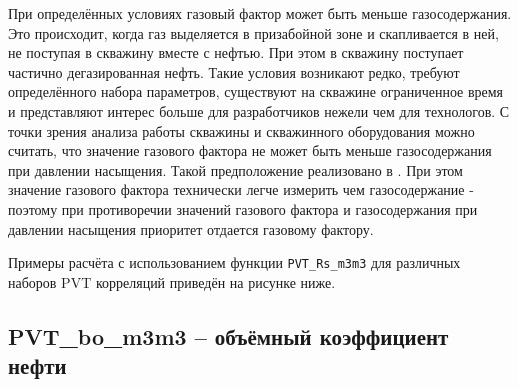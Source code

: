 При определённых условиях газовый фактор может быть меньше газосодержания. Это происходит, когда газ выделяется в призабойной зоне и скапливается в ней, не поступая в скважину вместе с нефтью. При этом в скважину поступает частично дегазированная нефть. Такие условия возникают редко, требуют определённого набора параметров, существуют на скважине ограниченное время и представляют интерес больше для разработчиков нежели чем для технологов. С точки зрения анализа работы скважины и скважинного оборудования можно считать, что значение газового фактора не может быть меньше газосодержания при давлении насыщения. Такой предположение реализовано в \unf{}. При этом значение газового фактора технически легче измерить чем газосодержание - поэтому при противоречии значений газового фактора и газосодержания при давлении насыщения приоритет отдается газовому фактору. 


Примеры расчёта с использованием функции \texttt{PVT_Rs_m3m3} для различных наборов PVT корреляций приведён на рисунке ниже.

\newcommand{\RsDataFile}{data/Rs_P_data.txt}


\subsection{PVT\_bo\_m3m3 – объёмный коэффициент нефти}

